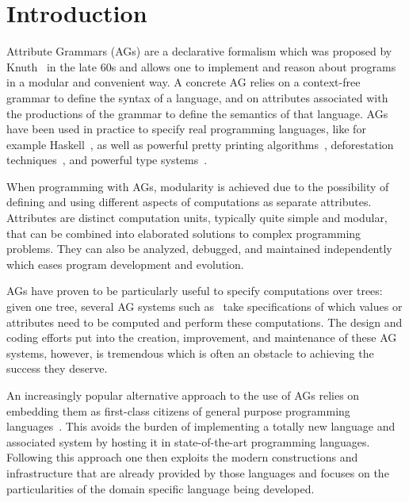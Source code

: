 \documentclass[runningheads]{llncs}
\begin{document}
\section{Introduction}\label{sec:introduction}

  Attribute Grammars (AGs) are a declarative formalism which was proposed by
  Knuth~\cite{Knuth68} in the late 60s and allows one to implement and reason
  about programs in a modular and convenient way. A concrete AG relies on a
  context-free grammar to define the syntax of a language, and on attributes
  associated with the productions of the grammar to define the semantics of that
  language. AGs have been used in practice to specify real programming
  languages, like for example Haskell~\cite{DijkstraFS09}, as well as powerful
  pretty printing algorithms~\cite{SPS99}, deforestation
  techniques~\cite{joao07pepm}, and powerful type systems~\cite{MiddelkoopDS10}.

  When programming with AGs, modularity is achieved due to the possibility of
  defining and using different aspects of computations as separate attributes.
  Attributes are distinct computation units, typically quite simple and modular,
  that can be combined into elaborated solutions to complex programming
  problems. They can also be analyzed, debugged, and maintained independently
  which eases program development and evolution.

  AGs have proven to be particularly useful to specify computations over trees:
  given one tree, several AG systems such as~\cite{syngen,uuag,lrc,silver} take
  specifications of which values or attributes need to be computed and perform
  these computations. The design and coding efforts put into the creation,
  improvement, and maintenance of these AG systems, however, is tremendous which
  is often an obstacle to achieving the success they deserve.

  An increasingly popular alternative approach to the use of AGs relies on
  embedding them as first-class citizens of general purpose programming
  languages~\cite{Oege00,DBLP:conf/sblp/MartinsFS13,erlangAGs,kiama,doaitse09icfp,balestrieri}.
  This avoids the burden of implementing a totally new language and associated
  system by hosting it in state-of-the-art programming languages. Following this
  approach one then exploits the modern constructions and infrastructure that
  are already provided by those languages and focuses on the particularities of
  the domain specific language being developed.
\end{document}
